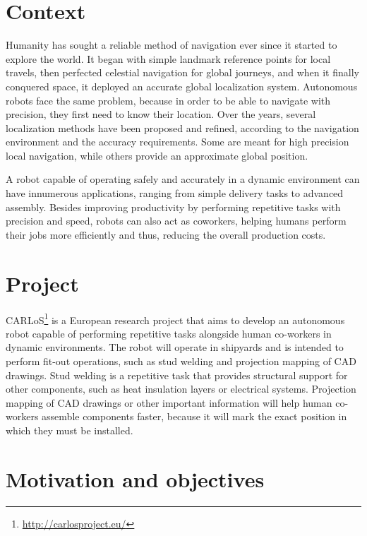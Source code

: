 \documentclass[9pt,a4paper]{extarticle}
\begin{document}
\begin{multicols}{2}

\section{Context}

Humanity has sought a reliable method of navigation ever since it started to explore the world. It began with simple landmark reference points for local travels, then perfected celestial navigation for global journeys, and when it finally conquered space, it deployed an accurate global localization system. Autonomous robots face the same problem, because in order to be able to navigate with precision, they first need to know their location. Over the years, several localization methods have been proposed and refined, according to the navigation environment and the accuracy requirements. Some are meant for high precision local navigation, while others provide an approximate global position.

A robot capable of operating safely and accurately in a dynamic environment can have innumerous applications, ranging from simple delivery tasks to advanced assembly. Besides improving productivity by performing repetitive tasks with precision and speed, robots can also act as coworkers, helping humans perform their jobs more efficiently and thus, reducing the overall production costs.


\section{Project}

CARLoS\footnote{\url{http://carlosproject.eu/}} is a European research project that aims to develop an autonomous robot capable of performing repetitive tasks alongside human co-workers in dynamic environments. The robot will operate in shipyards and is intended to perform fit-out operations, such as stud welding and projection mapping of CAD drawings. Stud welding is a repetitive task that provides structural support for other components, such as heat insulation layers or electrical systems. Projection mapping of CAD drawings or other important information will help human co-workers assemble components faster, because it will mark the exact position in which they must be installed.


\section{Motivation and objectives}


\end{multicols}
\end{document}
